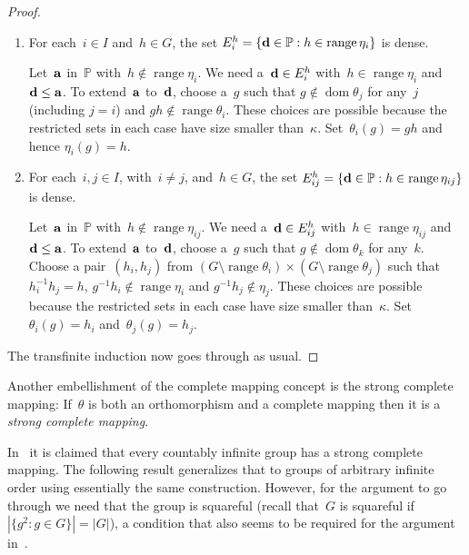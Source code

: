 \documentclass[12pt,a4paper]{article}
\DeclareMathOperator{\dom}{dom}
\DeclareMathOperator{\ran}{range}
\renewcommand{\P}{\mathbb{P}}
\begin{document}
\begin{proof}
\begin{enumerate}
\item For each~$i \in I$ and~$h \in G$, the set $E_i^h = \{ {\bf d} \in \P : h \in \ran \eta_i \}$ is dense.

Let~${\bf a}$ in~$\P$ with~$h \not\in \ran \eta_i$.  We need a~${\bf d} \in E_i^h$ with~$h \in \ran \eta_i$ and ${\bf d} \leq {\bf a}$.  To extend~${\bf a}$ to~${\bf d}$, choose a~$g$ such that $g \not\in \dom \theta_j$ for any~$j$ (including $j=i$) and $gh \not\in \ran \theta_i$.  These choices are possible because the restricted sets in each case have size smaller than~$\kappa$.  Set~$\theta_i(g) = gh$  and hence $\eta_i(g) = h$.   


\item For each~$i,j \in I$, with~$i \neq j$, and~$h \in G$, the set $E_{ij}^h = \{ {\bf d} \in \P : h \in \ran \eta_{ij} \}$ is dense.

Let~${\bf a}$ in~$\P$ with~$h \not\in \ran \eta_{ij}$.  We need a~${\bf d} \in E_{ij}^h$ with~$h \in \ran \eta_{ij}$ and ${\bf d} \leq {\bf a}$.  To extend~${\bf a}$ to~${\bf d}$, choose a~$g$ such that $g \not\in \dom \theta_k$ for any~$k$.   Choose a pair~$(h_i,h_j)$ from $(G \setminus \ran \theta_i) \times (G \setminus \ran \theta_j)$ such that~$h_i^{-1}h_j = h$, $g^{-1}h_i \not\in \ran \eta_i$ and $g^{-1}h_j \not\in \eta_j$. These choices are possible because the restricted sets in each case have size smaller than~$\kappa$.
 Set~$\theta_i(g) = h_i$ and~$\theta_j(g) = h_j$.


\end{enumerate}

The transfinite induction now goes through as usual.
\end{proof}












Another embellishment of the complete mapping concept is the strong complete mapping:
If~$\theta$ is both an orthomorphism and a complete mapping then it is a {\em strong complete mapping}.   

In~\cite{Evans12} it is claimed that every countably infinite group has a strong complete mapping.  The following result generalizes that to groups of arbitrary infinite order using essentially the same construction.  However, for the argument to go through we need that the group is squareful (recall that~$G$ is squareful if $|\{g^2 : g \in G \}| = |G|$), a condition that also seems to be required for the argument in~\cite{Evans12}.
\end{document}
